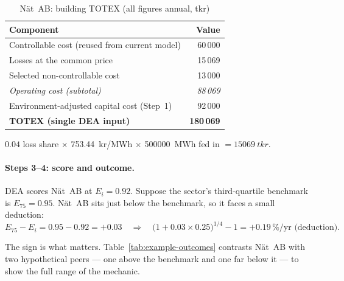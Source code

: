 \begin{table}[H]
\centering
\footnotesize
\begin{threeparttable}
\caption{Nät~AB: building TOTEX (all figures annual, tkr)}
\label{tab:example-totex}
\begin{tabular}{@{}lr@{}}
\toprule
\textbf{Component} & \textbf{Value} \\
\midrule
Controllable cost (reused from current model)        & 60\,000 \\
Losses at the common price\tnote{a}                  & 15\,069 \\
Selected non-controllable cost                       & 13\,000 \\
\midrule
\textit{Operating cost (subtotal)}                   & \textit{88\,069} \\
Environment-adjusted capital cost (Step~1)           & 92\,000 \\
\midrule
\textbf{TOTEX (single DEA input)}                    & \textbf{180\,069} \\
\bottomrule
\end{tabular}
\begin{tablenotes}
\item[a] $0.04$ loss share $\times$ \SI{753.44}{kr/MWh} $\times$
\SI{500000}{MWh} fed in $=\SI{15069}{tkr}$.
\end{tablenotes}
\end{threeparttable}
\end{table}

\paragraph{Steps 3--4: score and outcome.}
DEA scores Nät~AB at $E_i = 0.92$. Suppose the sector's third-quartile benchmark
is $E_{75} = 0.95$. Nät~AB sits just below the benchmark, so it faces a small
deduction:
\[
E_{75}-E_i = 0.95 - 0.92 = +0.03
\quad\Rightarrow\quad
\bigl(1 + 0.03 \times 0.25\bigr)^{1/4} - 1 = +0.19\,\%\text{/yr (deduction).}
\]

The sign is what matters. Table~\ref{tab:example-outcomes} contrasts Nät~AB with
two hypothetical peers --- one above the benchmark and one far below it --- to show
the full range of the mechanic.

